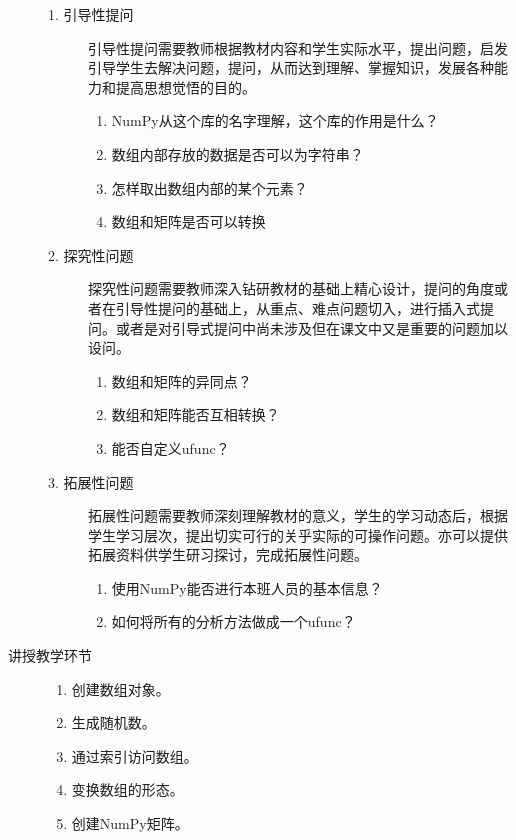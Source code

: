 \documentclass[12pt,a4paper,openany,cap]{ctexbook}
\begin{document}
\begin{description}
  \begin{minipage}[t]{0.8\linewidth}
    \begin{description}
    \item[1. 引导性提问]
引导性提问需要教师根据教材内容和学生实际水平，提出问题，启发引导学生去解决问题，提问，从而达到理解、掌握知识，发展各种能力和提高思想觉悟的目的。
\begin{enumerate}
\item  NumPy从这个库的名字理解，这个库的作用是什么？
\item\label{item:10}  数组内部存放的数据是否可以为字符串？
\item\label{item:11}  怎样取出数组内部的某个元素？
\item\label{item:12}  数组和矩阵是否可以转换
\end{enumerate}
\item[2. 探究性问题] 
探究性问题需要教师深入钻研教材的基础上精心设计，提问的角度或者在引导性提问的基础上，从重点、难点问题切入，进行插入式提问。或者是对引导式提问中尚未涉及但在课文中又是重要的问题加以设问。
\begin{enumerate}
\item  数组和矩阵的异同点？
\item\label{item:13}  数组和矩阵能否互相转换？
\item\label{item:14}  能否自定义ufunc？
\end{enumerate}
\item[3. 拓展性问题] 
拓展性问题需要教师深刻理解教材的意义，学生的学习动态后，根据学生学习层次，提出切实可行的关乎实际的可操作问题。亦可以提供拓展资料供学生研习探讨，完成拓展性问题。
\begin{enumerate}
\item  使用NumPy能否进行本班人员的基本信息？
\item\label{item:15}  如何将所有的分析方法做成一个ufunc？
\end{enumerate}
    \end{description}
  \end{minipage}
  \item[讲授教学环节]
    \begin{minipage}[t]{0.8\linewidth}
      \begin{enumerate}
      \item         创建数组对象。
\item\label{item:16}  生成随机数。
\item\label{item:17}  通过索引访问数组。
\item\label{item:71}  变换数组的形态。
\item\label{item:72}  创建NumPy矩阵。

\end{enumerate}
\end{minipage}
\end{description}
\end{document}
